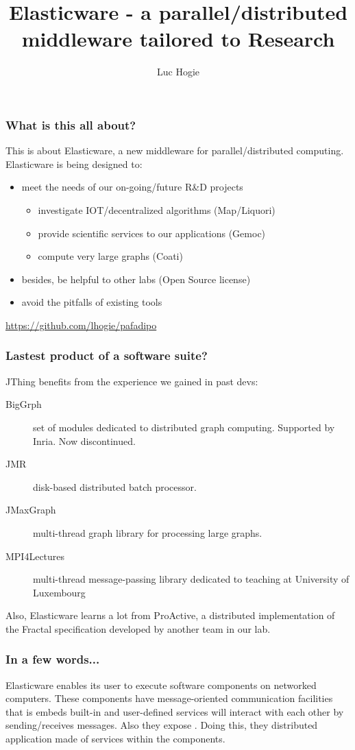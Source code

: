 \documentclass[11pt]{beamer}
\author{Luc Hogie}
\title{Elasticware - a parallel/distributed middleware tailored to Research}
\institute{Cnrs/Inria/Université Côte d'Azur}
\begin{document}
\begin{frame}
\titlepage
\end{frame}



\begin{frame}
\frametitle{What is this all about?}
This is about Elasticware, a new middleware for parallel/distributed computing.
Elasticware is being designed to:
\begin{itemize}
	\item meet the needs of our on-going/future R\&D projects
		\begin{itemize}
			\item investigate IOT/decentralized algorithms (Map/Liquori)
			\item provide scientific services to our applications (Gemoc)
			\item compute very large graphs (Coati)
		\end{itemize}
	\item besides, be helpful to other labs (Open Source license)
	\item avoid the pitfalls of existing tools
\end{itemize}
\url{https://github.com/lhogie/pafadipo}
\end{frame}


\begin{frame}
\frametitle{Lastest product of a software suite?}
JThing benefits from the experience we gained in past devs:
\begin{description}
	\item[BigGrph] set of modules dedicated to distributed graph computing. Supported by Inria. Now discontinued.
	\item[JMR] disk-based distributed batch processor.
	\item[JMaxGraph] multi-thread graph library for   processing large graphs.
	\item[MPI4Lectures]multi-thread message-passing library dedicated to teaching at University of Luxembourg
\end{description}
Also, Elasticware learns a lot from ProActive,  a distributed implementation of the Fractal specification  developed by another team in our lab.
\end{frame}


\begin{frame}
\frametitle{In a few words...}
Elasticware enables its user to execute software components on networked computers. These components have message-oriented communication facilities that is embeds built-in and user-defined services   will interact with each other by sending/receives messages. Also they expose . Doing this, they  distributed application made of services within the components.
\end{frame}
\end{document}
